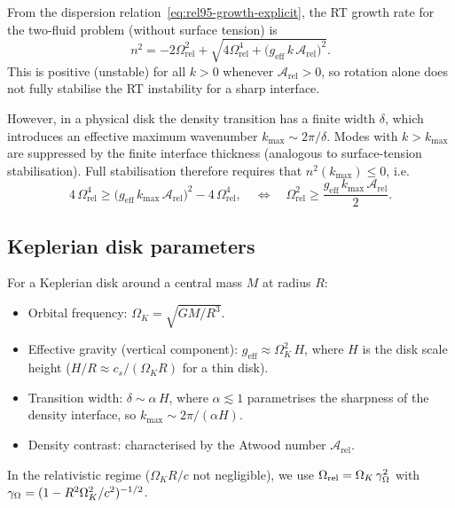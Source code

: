 From the dispersion relation~\eqref{eq:rel95-growth-explicit}, the
RT growth rate for the two-fluid problem (without surface tension) is
\begin{equation}
n^{2} = -2\Omega_{\mathrm{rel}}^{2}
  + \sqrt{4\Omega_{\mathrm{rel}}^{4}
    + \bigl(g_{\mathrm{eff}}\,k\,\mathcal{A}_{\mathrm{rel}}\bigr)^{2}}.
\label{eq:rel95-n2-recap}
\end{equation}
This is positive (unstable) for all $k > 0$ whenever
$\mathcal{A}_{\mathrm{rel}} > 0$, so rotation alone does not
fully stabilise the RT instability for a sharp interface.

However, in a physical disk the density transition has a finite
width $\delta$, which introduces an effective maximum wavenumber
$k_{\max} \sim 2\pi/\delta$.  Modes with $k > k_{\max}$ are
suppressed by the finite interface thickness (analogous to
surface-tension stabilisation).  Full stabilisation therefore
requires that $n^{2}(k_{\max}) \leq 0$, i.e.\
\begin{equation}
\boxed{\;
4\,\Omega_{\mathrm{rel}}^{4}
  \geq \bigl(g_{\mathrm{eff}}\,k_{\max}\,
    \mathcal{A}_{\mathrm{rel}}\bigr)^{2}
  - 4\,\Omega_{\mathrm{rel}}^{4},
\quad\Longleftrightarrow\quad
\Omega_{\mathrm{rel}}^{2}
  \geq \frac{g_{\mathrm{eff}}\,k_{\max}\,
    \mathcal{A}_{\mathrm{rel}}}{2}.
\;}
\label{eq:rel95-full-stab-cond}
\end{equation}

\subsection{Keplerian disk parameters}

For a Keplerian disk around a central mass $M$ at radius $R$:
\begin{itemize}
\item Orbital frequency:
  $\Omega_{K} = \sqrt{GM/R^{3}}$.
\item Effective gravity (vertical component):
  $g_{\mathrm{eff}} \approx \Omega_{K}^{2}\,H$, where $H$ is
  the disk scale height ($H/R \approx c_{s}/(\Omega_{K}R)$
  for a thin disk).
\item Transition width: $\delta \sim \alpha\,H$, where
  $\alpha \lesssim 1$ parametrises the sharpness of the
  density interface, so $k_{\max} \sim 2\pi/(\alpha H)$.
\item Density contrast: characterised by the Atwood number
  $\mathcal{A}_{\mathrm{rel}}$.
\end{itemize}

In the relativistic regime ($\Omega_{K}R/c$ not negligible), we
use $\Omega_{\mathrm{rel}} = \Omega_{K}\,\gamma_{\Omega}^{2}$
with $\gamma_{\Omega} = (1 - R^{2}\Omega_{K}^{2}/c^{2})^{-1/2}$.

